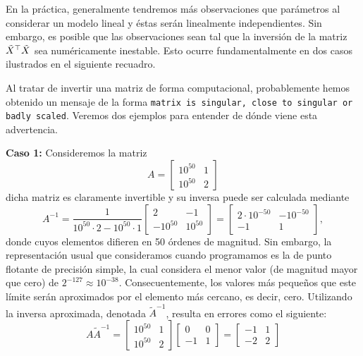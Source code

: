 En la práctica, generalmente tendremos más observaciones que parámetros al considerar un modelo lineal y éstas serán linealmente independientes. Sin embargo, es posible que las observaciones sean tal que la inversión de la matriz  $\tilde{X}^\top\tilde{X}$ sea numéricamente  inestable. Esto ocurre fundamentalmente en dos casos ilustrados en el siguiente recuadro.  

\begin{mdframed}[style=discusion, frametitle={\center ¿Matriz cuasi-singular o incorrectamente escalada?}]

Al tratar de invertir una matriz de forma computacional, probablemente hemos obtenido un mensaje de la forma \texttt{matrix is singular, close to singular or badly scaled}. Veremos dos ejemplos para entender de dónde viene esta advertencia. 

\noindent\textbf{Caso 1:} Consideremos la matriz 
\begin{equation}
	A = \left[ \begin{matrix}10^{50} & 1 \\  10^{50}  & 2\end{matrix}\right]
\end{equation}
dicha matriz es claramente invertible y su inversa puede ser calculada mediante
\begin{equation}
	A^{-1} = \frac{1}{10^{50} \cdot 2 - 10^{50}\cdot 1}\left[ \begin{matrix}2 & -1 \\  -10^{50}  & 10^{50}\end{matrix}\right]
	=\left[ \begin{matrix}2\cdot10^{-50} & -10^{-50} \\  -1  & 1\end{matrix}\right],
\end{equation}
donde cuyos elementos difieren en 50 órdenes de magnitud. Sin embargo, la representación usual que consideramos cuando programamos es la de punto flotante de precisión simple, la cual considera el menor valor (de magnitud mayor que cero) de $2^{-127}\approx 10^{-38}$. Consecuentemente, los valores más pequeños que este límite serán aproximados por el elemento más cercano, es decir, cero. Utilizando la inversa aproximada, denotada $\tilde{A}^{-1}$, resulta en errores como el siguiente:
\begin{equation}
	A\tilde{A}^{-1} = \left[ \begin{matrix}10^{50} & 1 \\  10^{50}  & 2\end{matrix}\right] \left[ \begin{matrix} 0 & 0 \\  -1  & 1\end{matrix}\right] = \left[ \begin{matrix} -1 & 1 \\  -2  & 2\end{matrix}\right]
\end{equation}


\end{mdframed}
